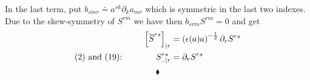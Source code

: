 In the last term, put $b_{smr}\doteq a^{sk}\partial_k a_{mr}$ which is symmetric in the last two indexes. Due to the skew-symmetry of $S^{rm}$ we have then $b_{srm}S^{rm}=0$ and get
\begin{align}
\left[\overline{S}^{rs} \right]_{|r}&=\left(\epsilon (a) a\right)^{-\frac{1}{2}}\partial_r S^{rs}\\
\text{(2) and (19):} \quad\quad\quad\quad S^{rs}_{..|r}&=\partial_r S^{rs}
\end{align} 
$$\blacklozenge$$

\newpage
